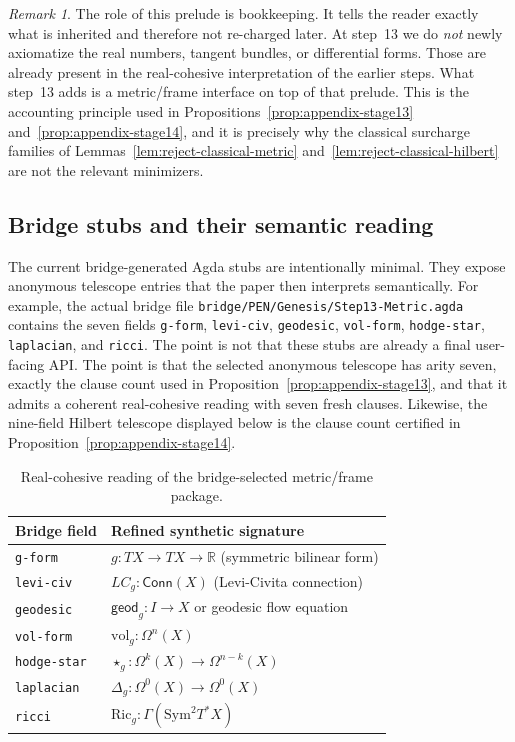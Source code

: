\documentclass{lmcs}
\theoremstyle{plain}
\theoremstyle{definition}
\theoremstyle{remark}
\newtheorem{rem}[thm]{Remark}
\newcommand{\R}{\ensuremath{\mathbb{R}}}
\begin{document}
\begin{rem}
The role of this prelude is bookkeeping.
It tells the reader exactly what is inherited and therefore not re-charged later.
At step~13 we do \emph{not} newly axiomatize the real numbers, tangent bundles, or differential forms.
Those are already present in the real-cohesive interpretation of the earlier steps.
What step~13 adds is a metric/frame interface on top of that prelude.
This is the accounting principle used in Propositions~\ref{prop:appendix-stage13} and~\ref{prop:appendix-stage14}, and it is precisely why the classical surcharge families of Lemmas~\ref{lem:reject-classical-metric} and~\ref{lem:reject-classical-hilbert} are not the relevant minimizers.
\end{rem}

\subsection{Bridge stubs and their semantic reading}

The current bridge-generated Agda stubs are intentionally minimal.
They expose anonymous telescope entries that the paper then interprets semantically.
For example, the actual bridge file \texttt{bridge/PEN/Genesis/Step13-Metric.agda} contains the seven fields
\texttt{g-form}, \texttt{levi-civ}, \texttt{geodesic}, \texttt{vol-form}, \texttt{hodge-star}, \texttt{laplacian}, and \texttt{ricci}.
The point is not that these stubs are already a final user-facing API.
The point is that the selected anonymous telescope has arity seven, exactly the clause count used in Proposition~\ref{prop:appendix-stage13}, and that it admits a coherent real-cohesive reading with seven fresh clauses.
Likewise, the nine-field Hilbert telescope displayed below is the clause count certified in Proposition~\ref{prop:appendix-stage14}.

\begin{table}[tbp]
\centering
\caption{Real-cohesive reading of the bridge-selected metric/frame package.}
\label{tab:metric-reading}
\small
\begin{tabular}{@{}ll@{}}
\toprule
Bridge field & Refined synthetic signature \\
\midrule
\texttt{g-form}     & $g : TX \to TX \to \R$ (symmetric bilinear form) \\
\texttt{levi-civ}   & $LC_g : \mathsf{Conn}(X)$ (Levi-Civita connection) \\
\texttt{geodesic}   & $\mathsf{geod}_g : I \to X$ or geodesic flow equation \\
\texttt{vol-form}   & $\mathrm{vol}_g : \Omega^n(X)$ \\
\texttt{hodge-star} & $\star_g : \Omega^k(X)\to \Omega^{n-k}(X)$ \\
\texttt{laplacian}  & $\Delta_g : \Omega^0(X)\to \Omega^0(X)$ \\
\texttt{ricci}      & $\mathrm{Ric}_g : \Gamma(\mathrm{Sym}^2 T^\ast X)$ \\
\bottomrule
\end{tabular}
\end{table}
\end{document}

